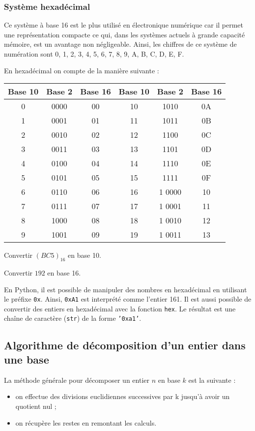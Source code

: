 \subsubsection{Système hexadécimal}
Ce système à base 16 est le plus utilisé en électronique numérique car il permet une représentation compacte ce qui, dans les systèmes actuels à grande capacité mémoire, est un avantage non négligeable. 
Ainsi, les chiffres de ce système de numération sont 0, 1, 2, 3, 4, 5, 6, 7, 8, 9, A, B, C, D, E, F.  

\begin{exemple}
En hexadécimal on compte de la manière suivante : 
\begin{center}
\begin{tabular}{|c|c|c||c|c|c|}
\hline
Base 10 & Base 2 & Base 16 & Base 10 & Base 2 & Base 16 \\
\hline \hline
0 & 0000 & 00 & 10 & 1010 & 0A \\ \hline
1 & 0001& 01 & 11  & 1011 & 0B \\ \hline
2 & 0010& 02 & 12  & 1100 & 0C \\ \hline
3 & 0011& 03 & 13  & 1101 & 0D \\ \hline
4 & 0100& 04 & 14  & 1110 & 0E \\ \hline
5 & 0101& 05 & 15  & 1111 & 0F \\ \hline
6 & 0110& 06 & 16  & 1 0000 & 10\\ \hline
7 & 0111& 07 & 17  & 1 0001 & 11 \\ \hline
8 & 1000& 08 & 18  & 1 0010 & 12 \\ \hline
9 & 1001& 09 & 19  & 1 0011 & 13 \\ \hline
\end{tabular}
\end{center}


Convertir $\left(BC5 \right)_{16}$ en base 10.

Convertir $192$ en base 16.

\end{exemple}


En Python, il est possible de manipuler des nombres en hexadécimal en utilisant le préfixe \texttt{0x}. Ainsi, \texttt{0xA1} est interprété comme l'entier 161. 
Il est aussi possible de convertir des entiers en hexadécimal avec la fonction \texttt{hex}. Le résultat est une chaîne de caractère (\texttt{str}) de la forme \texttt{'0xa1'}.


\subsection{Algorithme de décomposition d'un entier dans une base}
\begin{methode}
La méthode générale pour décomposer un entier $n$ en base $k$ est la suivante :
\begin{itemize}
\item on effectue des divisions euclidiennes successives par k jusqu’à avoir un quotient nul ;
\item on récupère les restes en remontant les calculs.
\end{itemize}
\end{methode}

